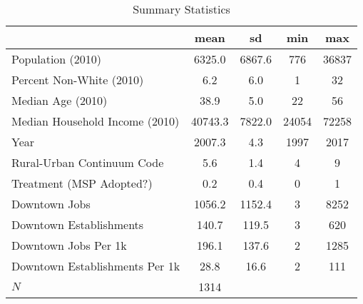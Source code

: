 \begin{table}[htbp]\centering
\def\sym#1{\ifmmode^{#1}\else\(^{#1}\)\fi}
\caption{Summary Statistics}
\begin{tabular}{l*{1}{cccc}}
\toprule
            &        mean&          sd&         min&         max\\
\midrule
Population (2010)&      6325.0&      6867.6&         776&       36837\\
Percent Non-White (2010)&         6.2&         6.0&           1&          32\\
Median Age (2010)&        38.9&         5.0&          22&          56\\
Median Household Income (2010)&     40743.3&      7822.0&       24054&       72258\\
Year        &      2007.3&         4.3&        1997&        2017\\
Rural-Urban Continuum Code&         5.6&         1.4&           4&           9\\
Treatment (MSP Adopted?)&         0.2&         0.4&           0&           1\\
Downtown Jobs&      1056.2&      1152.4&           3&        8252\\
Downtown Establishments&       140.7&       119.5&           3&         620\\
Downtown Jobs Per 1k&       196.1&       137.6&           2&        1285\\
Downtown Establishments Per 1k&        28.8&        16.6&           2&         111\\
\midrule
\(N\)       &        1314&            &            &            \\
\bottomrule
\end{tabular}
\end{table}
